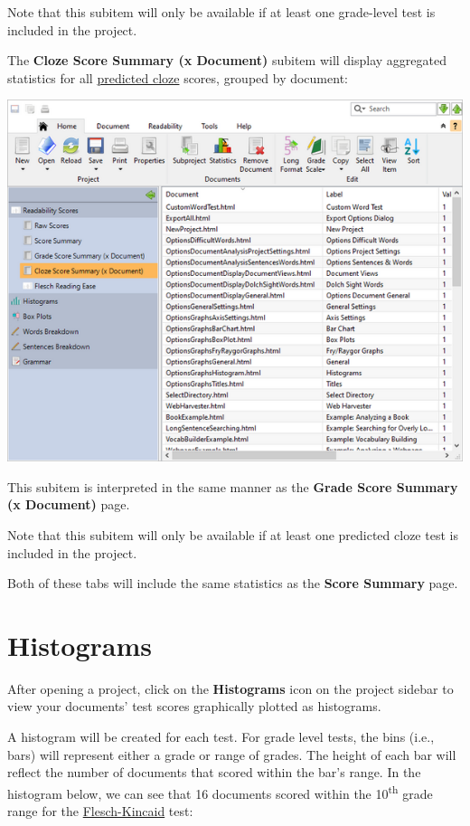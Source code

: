\documentclass[
]{book}
\theoremstyle{definition}
\theoremstyle{definition}
\theoremstyle{definition}
\theoremstyle{definition}
\theoremstyle{remark}
\begin{document}
Note that this subitem will only be available if at least one grade-level test is included in the project.

The \textbf{Cloze Score Summary (x Document)} subitem will display aggregated statistics for all \protect\hyperlink{cloze}{predicted cloze} scores, grouped by document:

\includegraphics{Images/BatchClozeScoresByDocument.png}

This subitem is interpreted in the same manner as the \textbf{Grade Score Summary (x Document)} page.

Note that this subitem will only be available if at least one predicted cloze test is included in the project.

Both of these tabs will include the same statistics as the \textbf{Score Summary} page.

\hypertarget{reviewing-batch-histograms}{%
\section{Histograms}\label{reviewing-batch-histograms}}

After opening a project, click on the \textbf{Histograms} icon on the project sidebar to view your documents' test scores graphically plotted as histograms.

A histogram will be created for each test. For grade level tests, the bins (i.e., bars) will represent either a grade or range of grades. The height of each bar will reflect the number of documents that scored within the bar's range. In the histogram below, we can see that 16 documents scored within the 10\textsuperscript{th} grade range for the \protect\hyperlink{flesch-kincaid-test}{Flesch-Kincaid} test:
\end{document}
